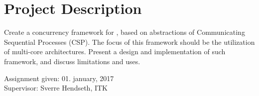 \setcounter{page}{0}
\newpage
{}
\section*{Project Description}
\label{sec:project_description}

Create a concurrency framework for \Cpp{}, based on abstractions of Communicating Sequential Processes (CSP). The focus of this framework should be the utilization of multi\hyp{}core architectures. Present a design and implementation of such framework, and discuss limitations and uses.

\begin{flushleft}
Assignment given: 01. january, 2017\\
Supervisor: Sverre Hendseth, ITK
\end{flushleft}


\afterpage{\blankpage}
